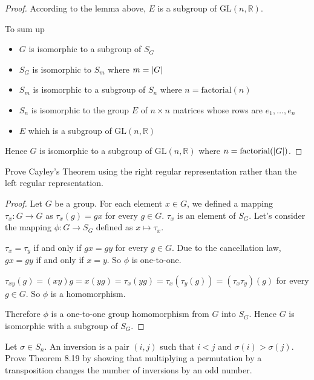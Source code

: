 \begin{proof}
    According to the lemma above, $E$ is a subgroup of $\text{GL}(n, \mathbb{R})$.

    To sum up
    \begin{itemize}
        \item $G$ is isomorphic to a subgroup of $S_{G}$
        \item $S_{G}$ is isomorphic to $S_{m}$ where $m = \left\vert{G}\right\vert$
        \item $S_{m}$ is isomorphic to a subgroup of $S_{n}$ where $n = \text{factorial}(n)$
        \item $S_{n}$ is isomorphic to the group $E$ of $n\times n$ matrices whose rows are $e_{1},\ldots, e_{n}$
        \item $E$ which is a subgroup of $\text{GL}(n, \mathbb{R})$
    \end{itemize}

    Hence $G$ is isomorphic to a subgroup of $\text{GL}(n, \mathbb{R})$ where $n = \text{factorial}(\left\vert{G}\right\vert)$.
\end{proof}

\begin{exercise}
    Prove Cayley's Theorem using the right regular representation rather than the left regular representation.
\end{exercise}

\begin{proof}
    Let $G$ be a group. For each element $x\in G$, we defined a mapping $\tau_{x}: G\to G$ as $\tau_{x}(g) = gx$ for every $g\in G$. $\tau_{x}$ is an element of $S_{G}$. Let's consider the mapping $\phi: G\to S_{G}$ defined as $x\mapsto \tau_{x}$.

    $\tau_{x} = \tau_{y}$ if and only if $gx = gy$ for every $g\in G$. Due to the cancellation law, $gx = gy$ if and only if $x = y$. So $\phi$ is one-to-one.

    $\tau_{xy}(g) = (xy)g = x(yg) = \tau_{x}(yg) = \tau_{x}(\tau_{y}(g)) = (\tau_{x}\tau_{y})(g)$ for every $g\in G$. So $\phi$ is a homomorphism.

    Therefore $\phi$ is a one-to-one group homomorphism from $G$ into $S_{G}$. Hence $G$ is isomorphic with a subgroup of $S_{G}$.
\end{proof}

\begin{exercise}
    Let $\sigma\in S_{n}$. An inversion is a pair $(i, j)$ such that $i < j$ and $\sigma(i) > \sigma(j)$. Prove Theorem 8.19 by showing that multiplying a permutation by a transposition changes the number of inversions by an odd number.
\end{exercise}

